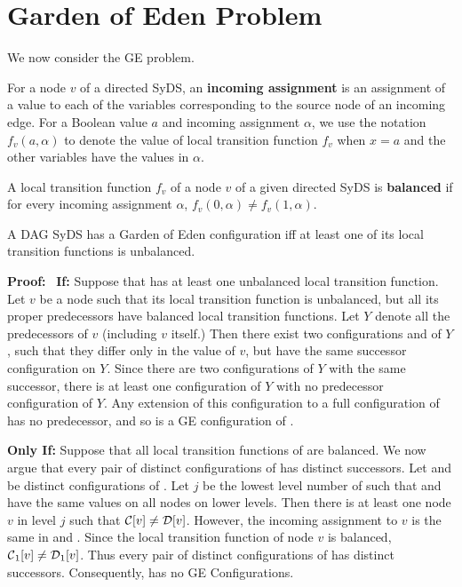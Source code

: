 \section{Garden of Eden Problem}
\label{sec:garden_eden}

We now consider the GE problem.
\smallskip
\begin{definition}\label{def:balanced_function}
For a node $v$ of a directed SyDS, an {\bf incoming assignment} is an assignment of a value to 
each of the variables corresponding to the source node of an incoming edge.
For a Boolean value $a$ and incoming assignment $\alpha$,
we use the notation $f_v(a,\alpha)$ to denote the value of 
local transition function $f_v$ when $x = a$ and the other variables have the values in $\alpha$.

A local transition function $f_v$ of a node $v$ of a given directed SyDS
is {\bf balanced} if for every incoming assignment $\alpha$, $f_v(0,\alpha) \neq f_v(1,\alpha)$.
\end{definition}

\smallskip
\begin{theorem}\label{thm:GardenEden-balanced}
A DAG SyDS \cals{} has a Garden of Eden configuration iff
at least one of its local transition functions is unbalanced.
\end{theorem}
\noindent
\textbf{Proof:}~
{\bf If:} Suppose that \cals{} has at least one unbalanced local transition function.
Let $v$ be a node such that its local transition function is unbalanced,
but all its proper predecessors have balanced local transition functions.
Let $Y$ denote all the predecessors of $v$
(including $v$ itself.)
Then there exist two configurations \calc{} and \cald{} of $Y$,
such that they differ only in the value of $v$,
but have the same successor configuration on $Y$.
Since there are two configurations of $Y$ with the same successor,
there is at least one configuration of $Y$ with no predecessor configuration of $Y$.
Any extension of this configuration to a full configuration of \cals{} 
has no predecessor, and so is a GE configuration of \cals{}.

\noindent
{\bf Only If:}
Suppose that all local transition functions of  \cals{} are balanced.
We now argue that every pair of distinct configurations of  \cals{} has distinct successors.
Let  \calc{} and \cald{} be distinct configurations of \cals{}.
Let $j$ be the lowest level number of \cals{}
such that  \calc{} and \cald{} have the same values on all nodes on lower levels.
Then there is at least one node $v$ in level $j$ such that $\mbox{$\mathcal{C}$}[v] \neq \mbox{$\mathcal{D}$}[v]$.
However, the incoming assignment to $v$ is the same in \calc{} and \cald{}.
Since the local transition function of node $v$ is balanced,
$\mbox{$\mathcal{C}$}_1[v] \neq \mbox{$\mathcal{D}$}_1[v]$.
Thus every pair of distinct configurations of  \cals{} has distinct successors.
Consequently,  \cals{} has no GE Configurations.
\QED

